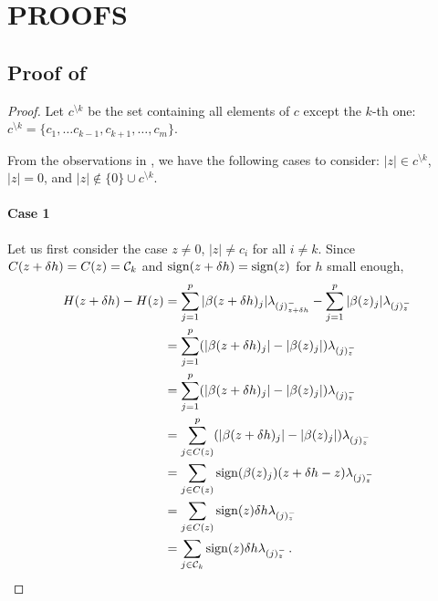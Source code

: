 \section{PROOFS}\label{sec:proofs}

\subsection{Proof of }

\begin{proof}\label{app:proof_directional_derivative}
  \label{app:proof_directional_slope}
  Let \(c^{\setminus k}\) be the set containing all elements of $c$ except the $k$-th one: $c^{\setminus k} =  \{c_1, \ldots c_{k-1}, c_{k+1}, \ldots, c_m \}$.

  From the observations in ,
  we have the following cases to consider: \(|z| \in c^{\setminus k}\),
  \(|z| = 0\), and \(|z| \notin \{0\} \cup c^{\setminus k}\).


  \paragraph{Case 1}
  Let us first consider the case $z \neq 0$, $|z| \neq c_i$ for all $i \neq k$.
  Since \(C(z + \delta h) = C(z) = \mathcal{C}_k\) and $\operatorname{sign}(z + \delta h) = \operatorname{sign}(z)$ for $h$ small enough,
  \begin{align}
    H(z + \delta h) - H(z)
      &= \sum_{j =1}^p |\beta(z + \delta h)_j| \lambda_{(j)^-_{z + \delta h}}
          - \sum_{j=1}^p |\beta(z)_j| \lambda_{(j)^-_z} \nonumber \\
      &= \sum_{j =1}^p (|\beta(z + \delta h)_j| - |\beta(z)_j|) \lambda_{(j)^-_z} \nonumber  \\
      &= \sum_{j =1}^p (|\beta(z + \delta h)_j| - |\beta(z)_j|) \lambda_{(j)^-_z} \nonumber  \\
      &= \sum_{j \in C(z)}^p (|\beta(z + \delta h)_j| - |\beta(z)_j|) \lambda_{(j)^-_z} \nonumber \\
      &= \sum_{j \in C(z)} \operatorname{sign}(\beta(z)_j) (z + \delta h - z) \lambda_{(j)^-_z} \nonumber \\
      &= \sum_{j \in C(z)} \operatorname{sign}(z) \delta h  \lambda_{(j)^-_z} \nonumber \\
      &= \sum_{j \in \mathcal{C}_k} \operatorname{sign}(z) \delta h  \lambda_{(j)^-_z} \, .
  \end{align}


\end{proof}
